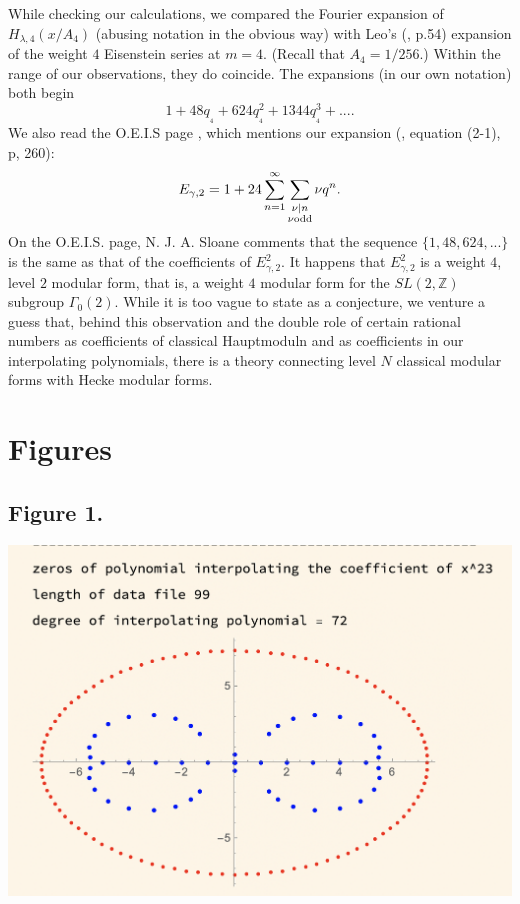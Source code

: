 \documentclass{article}
\begin{document}
\begin{remark}
While checking our calculations, we compared the 
Fourier expansion
of $H_{\lambda,4}(x/A_4)$ (abusing notation in the 
obvious way) with Leo's (\cite{leo2008fourier}, p.54)
expansion of the weight $4$ Eisenstein series at $m = 4$.
(Recall that $A_4 = 1/256.$)
Within the range of our observations, they do coincide. 
%
%
The expansions (in our own notation) both begin 
$$
1 + 48q_{_4} + 624 q_{_4}^2 + 1344 q_{_4}^3 + ....
$$
We also read the O.E.I.S  page
\cite{OEIS5},
which mentions our expansion
 (\cite{brent2001quadratic},
equation (2-1), p, 260):
$$
E_{\gamma,2} = 
\newline
1+24\sum_{n=1}^{\infty} 
\sum_{\substack{\nu | n \\ \nu \text{odd}}} \nu q^n.
$$
On the O.E.I.S. page, N. J. A. Sloane comments that the sequence
$\{1,48, 624, ... \}$ is the same as that of the
coefficients of $E_{\gamma,2}^2$. It happens that
$E_{\gamma,2}^2$ is a weight $4$, level $2$ modular form, that is,
a weight $4$ modular form for the $SL(2,\mathbb{Z})$ subgroup
$\Gamma_0(2)$. While it is too vague to state as a conjecture,
we venture a guess that, behind 
this observation and the double role
of  certain rational numbers as coefficients of
classical Hauptmoduln and as coefficients in our
interpolating polynomials, there is a theory connecting
level $N$ classical modular forms with Hecke modular forms.
\end{remark}
\section{Figures}
\subsection{Figure 1.}
\hskip 0in
\includegraphics[scale=.7]{Figure 1.png} 
\printbibliography
\end{document}
